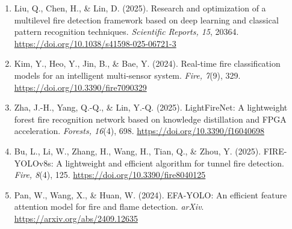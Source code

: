 \documentclass[12pt,a4paper]{article}
\begin{document}
\begin{enumerate}
  \item\label{liu2025ffdnet} Liu, Q., Chen, H., \& Lin, D. (2025). Research and optimization of a multilevel fire detection framework based on deep learning and classical pattern recognition techniques. \emph{Scientific Reports, 15}, 20364. \url{https://doi.org/10.1038/s41598-025-06721-3}
  \item\label{kim2024multisensor} Kim, Y., Heo, Y., Jin, B., \& Bae, Y. (2024). Real-time fire classification models for an intelligent multi-sensor system. \emph{Fire, 7}(9), 329. \url{https://doi.org/10.3390/fire7090329}
  \item\label{zha2025lightfirenet} Zha, J.-H., Yang, Q.-Q., \& Lin, Y.-Q. (2025). LightFireNet: A lightweight forest fire recognition network based on knowledge distillation and FPGA acceleration. \emph{Forests, 16}(4), 698. \url{https://doi.org/10.3390/f16040698}
  \item\label{bu2025fireyolo} Bu, L., Li, W., Zhang, H., Wang, H., Tian, Q., \& Zhou, Y. (2025). FIRE-YOLOv8s: A lightweight and efficient algorithm for tunnel fire detection. \emph{Fire, 8}(4), 125. \url{https://doi.org/10.3390/fire8040125}
  \item\label{pan2024efa} Pan, W., Wang, X., \& Huan, W. (2024). EFA-YOLO: An efficient feature attention model for fire and flame detection. \emph{arXiv}. \url{https://arxiv.org/abs/2409.12635}
\end{enumerate}
\end{document}
